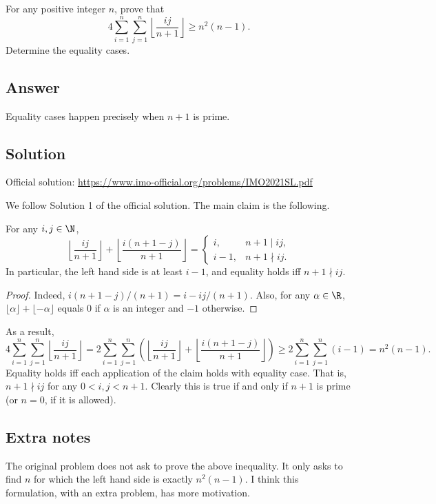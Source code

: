 For any positive integer $n$, prove that
\[ 4 \sum_{i = 1}^n \sum_{j = 1}^n \left\lfloor \frac{ij}{n + 1} \right\rfloor \geq n^2 (n - 1). \tag{*}\label{2021a2-eq0} \]
Determine the equality cases.




\subsection*{Answer}

Equality cases happen precisely when $n + 1$ is prime.



\subsection*{Solution}

Official solution: \url{https://www.imo-official.org/problems/IMO2021SL.pdf}

We follow Solution 1 of the official solution.
The main claim is the following.

\begin{claim}
For any $i, j \in \N$,
\[ \left\lfloor \frac{ij}{n + 1} \right\rfloor + \left\lfloor \frac{i(n + 1 - j)}{n + 1} \right\rfloor
    = \begin{cases} i, & n + 1 \mid ij, \\ i - 1, & n + 1 \nmid ij. \end{cases} \]
In particular, the left hand side is at least $i - 1$, and equality holds iff $n + 1 \nmid ij$.
\end{claim}
\begin{proof}
Indeed, $i(n + 1 - j)/(n + 1) = i - ij/(n + 1)$.
Also, for any $\alpha \in \R$, $\lfloor \alpha \rfloor + \lfloor -\alpha \rfloor$ equals $0$ if $\alpha$ is an integer and $-1$ otherwise.
\end{proof}

As a result,
\[ 4 \sum_{i = 1}^n \sum_{j = 1}^n \left\lfloor \frac{ij}{n + 1} \right\rfloor
    = 2 \sum_{i = 1}^n \sum_{j = 1}^n \left(\left\lfloor \frac{ij}{n + 1} \right\rfloor + \left\lfloor \frac{i(n + 1 - j)}{n + 1} \right\rfloor\right)
    \geq 2 \sum_{i = 1}^n \sum_{j = 1}^n (i - 1) = n^2 (n - 1). \]
Equality holds iff each application of the claim holds with equality case.
That is, $n + 1 \nmid ij$ for any $0 < i, j < n + 1$.
Clearly this is true if and only if $n + 1$ is prime (or $n = 0$, if it is allowed).



\subsection*{Extra notes}

The original problem does not ask to prove the above inequality.
It only asks to find $n$ for which the left hand side is exactly $n^2(n - 1)$.
I think this formulation, with an extra problem, has more motivation.
